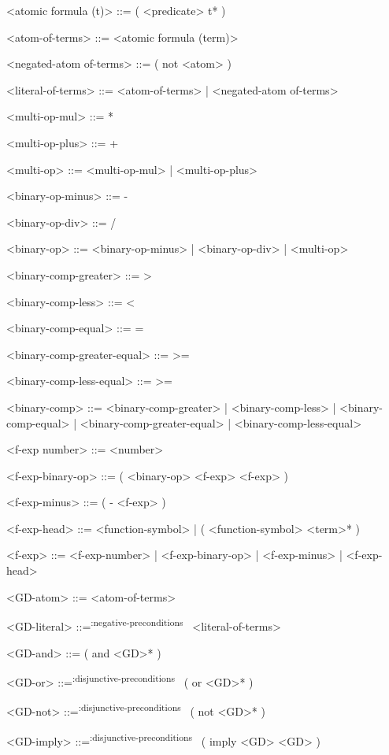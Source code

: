 \documentclass[]{article}
\newcommand{\negativepreconditions}{\textsuperscript{:negative-preconditions}~}
\newcommand{\disjunctivepreconditions}{\textsuperscript{:disjunctive-preconditions}~}
\begin{document}
\begin{grammar}
    <atomic formula (t)> ::= ( <predicate> t* )

    <atom-of-terms> ::= <atomic formula (term)>

    <negated-atom of-terms> ::= ( not <atom> )

    <literal-of-terms> ::= <atom-of-terms> | <negated-atom of-terms>


    <multi-op-mul> ::= *

    <multi-op-plus> ::= +

    <multi-op> ::= <multi-op-mul> | <multi-op-plus>

    <binary-op-minus> ::= -

    <binary-op-div> ::= /

    <binary-op> ::= <binary-op-minus> | <binary-op-div> | <multi-op>


    <binary-comp-greater> ::= >

    <binary-comp-less> ::= \textless

    <binary-comp-equal> ::= =

    <binary-comp-greater-equal> ::= >=

    <binary-comp-less-equal> ::= \textgreater=

    <binary-comp> ::= <binary-comp-greater> | <binary-comp-less> \newline
        | <binary-comp-equal> | <binary-comp-greater-equal> \newline
        | <binary-comp-less-equal>


    <f-exp number> ::= <number>

    <f-exp-binary-op> ::= ( <binary-op> <f-exp> <f-exp> )

    <f-exp-minus> ::= ( - <f-exp> )

    <f-exp-head> ::= <function-symbol> | ( <function-symbol> <term>* )

    <f-exp> ::= <f-exp-number> | <f-exp-binary-op> | <f-exp-minus> | <f-exp-head>

    <GD-atom> ::= <atom-of-terms>

    <GD-literal> ::=\negativepreconditions{} <literal-of-terms>

    <GD-and> ::=  ( and <GD>* )

    <GD-or> ::=\disjunctivepreconditions{} ( or <GD>* )

    <GD-not> ::=\disjunctivepreconditions{} ( not <GD>* )

    <GD-imply> ::=\disjunctivepreconditions{} ( imply <GD> <GD> )


\end{grammar}
\end{document}
